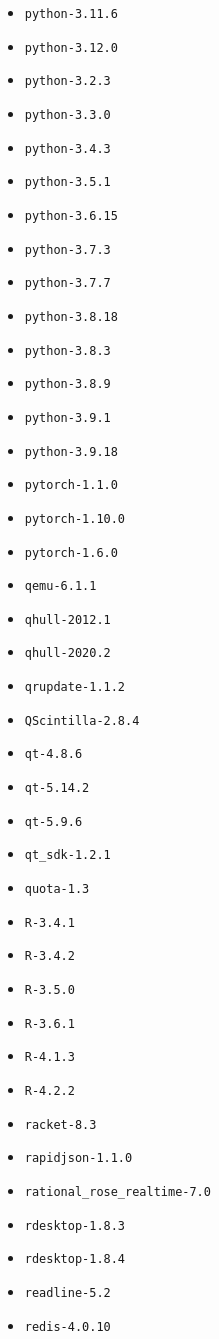 \begin{multicols}{3}
\begin{itemize}
\item \verb|python-3.11.6|
\item \verb|python-3.12.0|
\item \verb|python-3.2.3|
\item \verb|python-3.3.0|
\item \verb|python-3.4.3|
\item \verb|python-3.5.1|
\item \verb|python-3.6.15|
\item \verb|python-3.7.3|
\item \verb|python-3.7.7|
\item \verb|python-3.8.18|
\item \verb|python-3.8.3|
\item \verb|python-3.8.9|
\item \verb|python-3.9.1|
\item \verb|python-3.9.18|
\item \verb|pytorch-1.1.0|
\item \verb|pytorch-1.10.0|
\item \verb|pytorch-1.6.0|
\item \verb|qemu-6.1.1|
\item \verb|qhull-2012.1|
\item \verb|qhull-2020.2|
\item \verb|qrupdate-1.1.2|
\item \verb|QScintilla-2.8.4|
\item \verb|qt-4.8.6|
\item \verb|qt-5.14.2|
\item \verb|qt-5.9.6|
\item \verb|qt_sdk-1.2.1|
\item \verb|quota-1.3|
\item \verb|R-3.4.1|
\item \verb|R-3.4.2|
\item \verb|R-3.5.0|
\item \verb|R-3.6.1|
\item \verb|R-4.1.3|
\item \verb|R-4.2.2|
\item \verb|racket-8.3|
\item \verb|rapidjson-1.1.0|
\item \verb|rational_rose_realtime-7.0|
\item \verb|rdesktop-1.8.3|
\item \verb|rdesktop-1.8.4|
\item \verb|readline-5.2|
\item \verb|redis-4.0.10|

\end{itemize}
\end{multicols}
